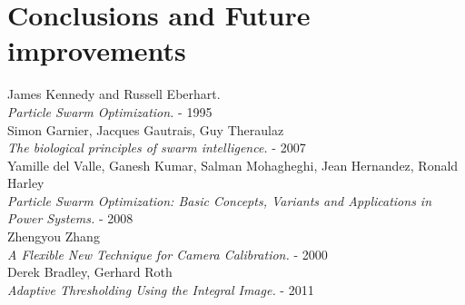 \documentclass[journal]{IEEEtran}
\begin{document}
\section{Conclusions and Future improvements}



\begin{thebibliography}{1}

  James Kennedy and Russell Eberhart. \\
  \textit{Particle Swarm Optimization.} - 1995
\\
  Simon Garnier, Jacques Gautrais, Guy Theraulaz\\
  \textit{The biological principles of swarm intelligence.} - 2007
\\
  Yamille del Valle, Ganesh Kumar, Salman Mohagheghi, Jean Hernandez, Ronald Harley\\
  \textit{Particle Swarm Optimization: Basic Concepts, Variants and Applications in Power Systems.} - 2008
\\
  Zhengyou Zhang \\
  \textit{A Flexible New Technique for Camera Calibration.} - 2000
\\
  Derek Bradley, Gerhard Roth \\
  \textit{Adaptive Thresholding Using the Integral Image.} - 2011

\end{thebibliography}
\end{document}
